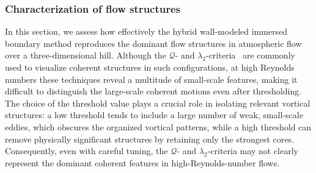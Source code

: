 \documentclass[%
superscriptaddress,
 amsmath,amssymb,
pra,
showkeys,
]{revtex4-2}
\newcommand{\colorline}[2][0.8em]{%
  \textcolor{#2}{\rule[0.5ex]{#1}{0.5pt}}%
}
\begin{document}

\subsubsection {Characterization of flow structures}

In this section, we assess how effectively the hybrid wall-modeled immersed boundary method reproduces the dominant flow structures in atmospheric flow over a three-dimensional hill. Although the $\mathcal{Q}$- and $\lambda_2$-criteria~\cite{jeong1995identification} are commonly used to visualize coherent structures in such configurations, at high Reynolds numbers these techniques reveal a multitude of small-scale features, making it difficult to distinguish the large-scale coherent motions even after thresholding. The choice of the threshold value plays a crucial role in isolating relevant vortical structures: a low threshold tends to include a large number of weak, small-scale eddies, which obscures the organized vortical patterns, while a high threshold can remove physically significant structures by retaining only the strongest cores. Consequently, even with careful tuning, the $\mathcal{Q}$- and $\lambda_2$-criteria may not clearly represent the dominant coherent features in high-Reynolds-number flows.  
\end{document}
